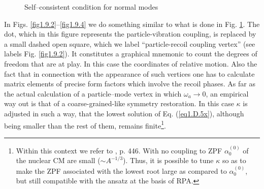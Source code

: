 \begin{subappendices}
\begin{figure}
{               }
               \caption{Self--consistent condition for normal modes}
               \label{fig1.D.1}
               \end{figure}
In Figs. \ref{fig1.9.2}--\ref{fig1.9.4} we do something   similar to what is done in Fig. \ref{fig1.D.1}. The dot, which in this figure represents the particle-vibration coupling, is 
replaced by a small dashed open square, which we  label ``particle-recoil coupling vertex'' (see labels Fig. \ref{fig1.9.2}). It constitutes a graphical mnemonic 
to count  the degrees of freedom that are at play. In this case the coordinates of relative motion. Also the fact that in connection with the appearance of 
such vertices one has to calculate matrix elements of precise form factors which involve the recoil phases. As far as the actual calculation of a particle--mode vertex in which $\omega_a\rightarrow 0$, an empirical
way out is that of a coarse-grained-like symmetry restoration.
In this case $\kappa$ is adjusted in such a way, that the lowest solution of Eq. (\ref{eq1.D.5x}), although
being smaller than the  rest of them, remains finite\footnote{Within this context we refer to \cite{Bohr:75}, p. 446. With no coupling to ZPF $\alpha^{(0)}_0$ of the nuclear CM are small ($\sim A^{-1/3}$). Thus, it is possible to tune $\kappa$ so as to make the ZPF associated with the lowest root large as compared to $\alpha^{(0)}_0$, but still compatible with the ansatz at the basis of RPA.}.


\end{subappendices}
